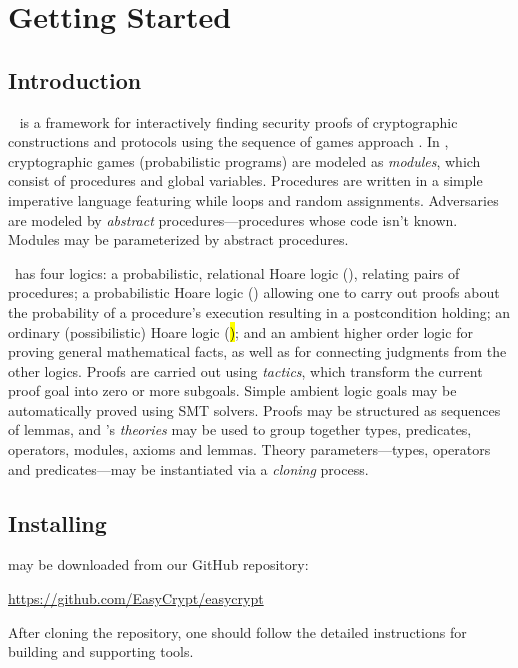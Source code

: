 \chapter{Getting Started}

\section{Introduction}

\EasyCrypt\ \cite{barthe-easycrypt-intro-2014,barthe-crypto-2011} is a
framework for interactively finding security proofs of cryptographic
constructions and protocols using the sequence of games approach
\cite{bellare-rogaway-code-based-2004,%
  bellare-rogaway-triple-enc-2006,shoup-seq-games-2004}.  In
\EasyCrypt, cryptographic games (probabilistic programs) are modeled
as \emph{modules}, which consist of procedures and global variables.
Procedures are written in a simple imperative language featuring while
loops and random assignments. Adversaries are modeled by \emph{abstract}
procedures---procedures whose code isn't known. Modules may be parameterized
by abstract procedures.

\EasyCrypt\ has four logics: a probabilistic, relational Hoare logic
(\prhl), relating pairs of procedures; a probabilistic Hoare logic
(\phl) allowing one to carry out proofs about the probability of a
procedure's execution resulting in a postcondition holding; an
ordinary (possibilistic) Hoare logic (\hl); and an ambient higher
order logic for proving general mathematical facts, as well as for
connecting judgments from the other logics.  Proofs are carried out
using \emph{tactics}, which transform the current proof goal into zero
or more subgoals. Simple ambient logic goals may be automatically
proved using SMT solvers. Proofs may be structured as sequences of
lemmas, and \EasyCrypt's \emph{theories} may be used to group together
types, predicates, operators, modules, axioms and lemmas. Theory
parameters---types, operators and predicates---may be instantiated via
a \emph{cloning} process.

\section{Installing \EasyCrypt}

\EasyCrypt may be downloaded from our GitHub repository:
\begin{center}
  \url{https://github.com/EasyCrypt/easycrypt}
\end{center}
After cloning the repository, one should follow the detailed
instructions for building \EasyCrypt and supporting tools.

